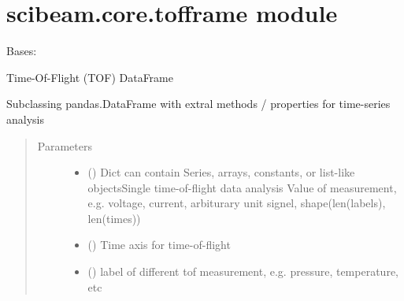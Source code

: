 \documentclass[letterpaper,10pt,english]{sphinxmanual}
\begin{document}
\section{scibeam.core.tofframe module}
\label{\detokenize{scibeam.core:module-scibeam.core.tofframe}}\label{\detokenize{scibeam.core:scibeam-core-tofframe-module}}

\begin{fulllineitems}
\label{\detokenize{scibeam.core:scibeam.core.tofframe.TOFFrame}}
Bases: 

Time-Of-Flight (TOF) DataFrame

Subclassing pandas.DataFrame with extral methods / properties for time-series analysis
\begin{quote}\begin{description}
\item[{Parameters}] \leavevmode\begin{itemize}
\item {} 
 (\sphinxstyleliteralemphasis{\sphinxupquote{ (}}\sphinxstyleliteralemphasis{\sphinxupquote{)}}\sphinxstyleliteralemphasis{\sphinxupquote{, }}) \textendash{} Dict can contain Series, arrays, constants, or list-like objectsSingle time-of-flight data analysis
Value of measurement, e.g. voltage, current, arbiturary unit signel, shape(len(labels), len(times))

\item {} 
 (\sphinxstyleliteralemphasis{\sphinxupquote{, }}) \textendash{} Time axis for time-of-flight

\item {} 
 (\sphinxstyleliteralemphasis{\sphinxupquote{, }}) \textendash{} label of different tof measurement, e.g. pressure, temperature, etc


\end{itemize}
\end{description}
\end{quote}
\end{fulllineitems}
\end{document}
